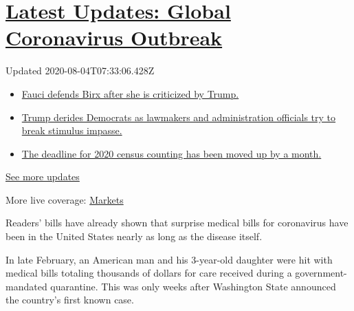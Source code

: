 \hypertarget{latest-updates-global-coronavirus-outbreak}{%
\section{\texorpdfstring{\href{https://www.nytimes.com/2020/08/03/world/coronavirus-covid-19.html?action=click\&pgtype=Article\&state=default\&region=MAIN_CONTENT_1\&context=storylines_live_updates}{Latest
Updates: Global Coronavirus
Outbreak}}{Latest Updates: Global Coronavirus Outbreak}}\label{latest-updates-global-coronavirus-outbreak}}

Updated 2020-08-04T07:33:06.428Z

\begin{itemize}
\tightlist
\item
  \href{https://www.nytimes.com/2020/08/03/world/coronavirus-covid-19.html?action=click\&pgtype=Article\&state=default\&region=MAIN_CONTENT_1\&context=storylines_live_updates\#link-4547638f}{Fauci
  defends Birx after she is criticized by Trump.}
\item
  \href{https://www.nytimes.com/2020/08/03/world/coronavirus-covid-19.html?action=click\&pgtype=Article\&state=default\&region=MAIN_CONTENT_1\&context=storylines_live_updates\#link-15e7f995}{Trump
  derides Democrats as lawmakers and administration officials try to
  break stimulus impasse.}
\item
  \href{https://www.nytimes.com/2020/08/03/world/coronavirus-covid-19.html?action=click\&pgtype=Article\&state=default\&region=MAIN_CONTENT_1\&context=storylines_live_updates\#link-e5a2cda}{The
  deadline for 2020 census counting has been moved up by a month.}
\end{itemize}

\href{https://www.nytimes.com/2020/08/03/world/coronavirus-covid-19.html?action=click\&pgtype=Article\&state=default\&region=MAIN_CONTENT_1\&context=storylines_live_updates}{See
more updates}

More live coverage:
\href{https://www.nytimes.com/live/2020/08/03/business/stock-market-today-coronavirus?action=click\&pgtype=Article\&state=default\&region=MAIN_CONTENT_1\&context=storylines_live_updates}{Markets}

Readers' bills have already shown that surprise medical bills for
coronavirus have been in the United States nearly as long as the disease
itself.

In late February, an American man and his 3-year-old daughter were hit
with medical bills totaling thousands of dollars for care received
during a government-mandated quarantine. This was only weeks after
Washington State announced the country's first known case.


